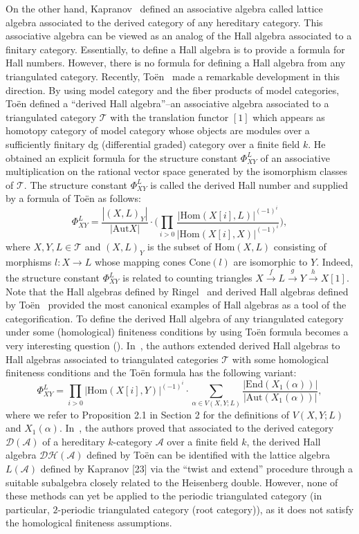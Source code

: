 \documentclass{amsart}
\theoremstyle{definition}
\numberwithin{equation}{section}
\begin{document}
On the other hand, Kapranov~\cite{Kap2} defined an associative
algebra called lattice algebra associated to the derived category of
any hereditary category. This associative algebra can be viewed as
an analog of the Hall algebra associated to a finitary category.
Essentially, to define a Hall algebra is to provide a formula for
Hall numbers. However, there is no formula for defining a Hall
algebra from any triangulated category. Recently,
To\"{e}n~\cite{Toen2005} made a remarkable development in this
direction. By using model category and the fiber products of model
categories, To\"{e}n defined a ``derived Hall algebra''--an
associative algebra associated to a triangulated category
$\mathcal{T}$ with the translation functor $[1]$ which appears as
homotopy category of model category whose objects are modules over a
sufficiently finitary dg (differential graded) category over a
finite field $k$. He obtained an explicit formula for the structure
constant $\Phi_{XY}^L$ of an associative multiplication on the
rational vector space generated by the isomorphism classes of
$\mathcal{T}$. The structure constant $\Phi_{XY}^L$ is called the
derived Hall number and supplied by a formula of To\"en
\cite[Proposition 5.1]{Toen2005} as follows:
$$\Phi_{XY}^L=\displaystyle\frac{|(X,L)_{Y}|}{|\mathrm{Aut}X|}\cdot
\big(\prod_{i>0}\displaystyle\frac{|{\mathrm{Hom}}(X[i],
L)|^{(-1)^i}}{|{\mathrm{Hom}}(X[i], X)|^{(-1)^i}}\big),$$ where $X, Y, L \in
\mathcal{T}$ and $(X,L)_{Y}$ is the subset of $\textrm{Hom}(X,L)$
consisting of morphisms $l: X\rightarrow L$ whose mapping cones
$\textrm{Cone}(l)$ are isomorphic to $Y$. Indeed, the structure
constant $\Phi_{XY}^L$ is related to counting triangles
$X\xrightarrow{f}L\xrightarrow{g}Y\xrightarrow{h}X[1]$. Note that
the Hall algebras defined by Ringel~\cite{Ringel1990} and derived
Hall algebras defined by To\"en~\cite{Toen2005} provided the most
canonical examples of Hall algebras as a tool of the
categorification. To define the derived Hall algebra of any
triangulated category under some (homological) finiteness conditions
by using To\"en formula becomes a very interesting question
(\cite[Remark 5.3]{Toen2005}). In~\cite{XX2006}, the authors
extended derived Hall algebras to Hall algebras associated to
triangulated categories $\mathcal{T}$ with some homological
finiteness conditions and the To\"en formula has the following
variant:
$$\Phi_{XY}^L=\prod_{i>0}|{\mathrm{Hom}}(X[i], Y)|^{(-1)^i}\cdot \sum_{\alpha\in V(X, Y; L)}\frac{|\mathrm{End}(X_1(\alpha))|}{|\mathrm{Aut}(X_1(\alpha))|},$$
where we refer to Proposition 2.1 in Section 2 for the definitions
of $V(X, Y; L)$ and $X_1(\alpha).$ In~\cite{SX}, the authors proved
that associated to the derived category ${{\mathcal{D}}}(\mathcal{A})$ of a
hereditary $k$-category $\mathcal{A}$ over a finite field $k$, the
derived Hall algebra $\mathcal{DH}(\mathcal{A})$ defined by To\"{e}n
can be identified with the lattice algebra $L(\mathcal{A})$ defined
by Kapranov [23] via the ``twist and extend'' procedure through a
suitable subalgebra closely related to the Heisenberg double.
However, none of these methods can yet be applied to the periodic
triangulated category (in particular, $2$-periodic triangulated
category (root category)), as it does not satisfy the homological
finiteness assumptions.
\end{document}
